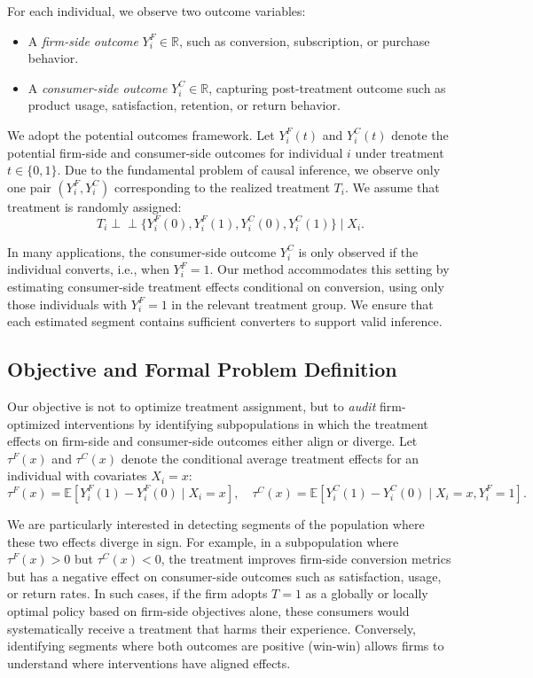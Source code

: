 \documentclass[11pt,letterpaper,english]{article}
\theoremstyle{definition}
\theoremstyle{definition}
\begin{document}
\begin{bibunit}
For each individual, we observe two outcome variables:
\begin{itemize}
    \item A \textit{firm-side outcome} $Y_i^F \in \mathbb{R}$, such as conversion, subscription, or purchase behavior.
    \item A \textit{consumer-side outcome} $Y_i^C \in \mathbb{R}$, capturing post-treatment outcome such as product usage, satisfaction, retention, or return behavior.
\end{itemize}

We adopt the potential outcomes framework. Let $Y_i^F(t)$ and $Y_i^C(t)$ denote the potential firm-side and consumer-side outcomes for individual $i$ under treatment $t \in \{0,1\}$. Due to the fundamental problem of causal inference, we observe only one pair $(Y_i^F, Y_i^C)$ corresponding to the realized treatment $T_i$. We assume that treatment is randomly assigned:
\[
T_i \perp \!\!\! \perp \{Y_i^F(0), Y_i^F(1), Y_i^C(0), Y_i^C(1)\} \mid X_i.
\]

In many applications, the consumer-side outcome $Y_i^C$ is only observed if the individual converts, i.e., when $Y_i^F = 1$. Our method accommodates this setting by estimating consumer-side treatment effects conditional on conversion, using only those individuals with $Y_i^F = 1$ in the relevant treatment group. We ensure that each estimated segment contains sufficient converters to support valid inference.

\subsection{Objective and Formal Problem Definition}

Our objective is not to optimize treatment assignment, but to \textit{audit} firm-optimized interventions by identifying subpopulations in which the treatment effects on firm-side and consumer-side outcomes either align or diverge. Let $\tau^F(x)$ and $\tau^C(x)$ denote the conditional average treatment effects for an individual with covariates $X_i = x$:
\[
\tau^F(x) = \mathbb{E}[Y_i^F(1) - Y_i^F(0) \mid X_i = x], \quad 
\tau^C(x) = \mathbb{E}[Y_i^C(1) - Y_i^C(0) \mid X_i = x, Y_i^F = 1].
\]

We are particularly interested in detecting segments of the population where these two effects diverge in sign. For example, in a subpopulation where $\tau^F(x) > 0$ but $\tau^C(x) < 0$, the treatment improves firm-side conversion metrics but has a negative effect on consumer-side outcomes such as satisfaction, usage, or return rates. In such cases, if the firm adopts $T=1$ as a globally or locally optimal policy based on firm-side objectives alone, these consumers would systematically receive a treatment that harms their experience. Conversely, identifying segments where both outcomes are positive (win-win) allows firms to understand where interventions have aligned effects.


\end{bibunit}
\end{document}
